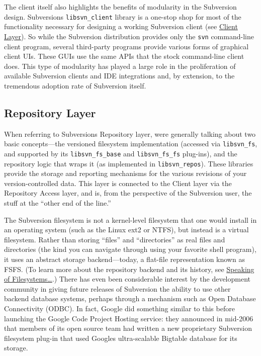 The client itself also highlights the benefits of modularity in the
Subversion design. Subversion\textquotesingle s \texttt{libsvn\_client}
library is a one-stop shop for most of the functionality necessary for
designing a working Subversion client (see
\hyperref[svn.developer.layerlib.client]{Client Layer}). So while the
Subversion distribution provides only the \texttt{svn} command-line
client program, several third-party programs provide various forms of
graphical client UIs. These GUIs use the same APIs that the stock
command-line client does. This type of modularity has played a large
role in the proliferation of available Subversion clients and IDE
integrations and, by extension, to the tremendous adoption rate of
Subversion itself.

\subsection{Repository Layer}\label{svn.developer.layerlib.repos}

When referring to Subversion\textquotesingle s Repository layer,
we\textquotesingle re generally talking about two basic concepts---the
versioned filesystem implementation (accessed via \texttt{libsvn\_fs},
and supported by its \texttt{libsvn\_fs\_base} and
\texttt{libsvn\_fs\_fs} plug-ins), and the repository logic that wraps
it (as implemented in \texttt{libsvn\_repos}). These libraries provide
the storage and reporting mechanisms for the various revisions of your
version-controlled data. This layer is connected to the Client layer via
the Repository Access layer, and is, from the perspective of the
Subversion user, the stuff at the ``other end of the line.''

The Subversion filesystem is not a kernel-level filesystem that one
would install in an operating system (such as the Linux ext2 or NTFS),
but instead is a virtual filesystem. Rather than storing ``files'' and
``directories'' as real files and directories (the kind you can navigate
through using your favorite shell program), it uses an abstract storage
backend---today, a flat-file representation known as FSFS. (To learn
more about the repository backend and its history, see
\hyperref[svn.reposadmin.basics.backends]{Speaking of
Filesystems\ldots{}}.) There has even been considerable interest by the
development community in giving future releases of Subversion the
ability to use other backend database systems, perhaps through a
mechanism such as Open Database Connectivity (ODBC). In fact, Google did
something similar to this before launching the Google Code Project
Hosting service: they announced in mid-2006 that members of its open
source team had written a new proprietary Subversion filesystem plug-in
that used Google\textquotesingle s ultra-scalable Bigtable database for
its storage.

